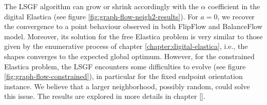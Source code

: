 The LSGF algorithm can grow or shrink accordingly with the $\alpha$ coefficient in the digital Elastica (see figure \ref{fig:graph-flow-neigh2-results}). For $a=0$, we recover the convergence to a point behaviour observed in both FlipFlow and BalanceFlow model. Moreover, its solution for the free Elastica problem is very similar to those given by the enumerative process of chapter \ref{chapter:digital-elastica}, i.e., the shapes converges to the expected global optimum. However, for the constrained Elastica problem, the LSGF encounters some difficulties to evolve (see figure \ref{fig:graph-flow-constrained}), in particular for the fixed endpoint orientation instance. We believe that a larger neighborhood, possibly random, could solve this issue. The results are explored in more details in chapter \ref{}.

\begin{figure}
\center
{}
\end{figure}
